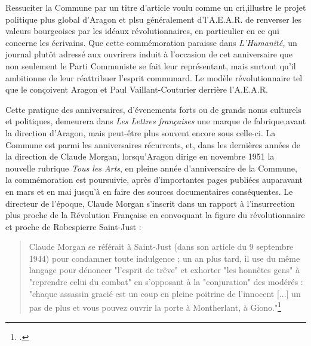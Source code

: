 Ressuciter la Commune par un titre d'article voulu comme un cri,illustre le projet politique plus global d'Aragon et plsu généralement d'l'A.E.A.R. de renverser les valeurs bourgeoises par les idéaux révolutionnaires, en particulier en ce qui concerne les écrivains. Que cette commémoration paraisse dans \emph{L'Humanité,} un journal plutôt adressé aux ouvrirers induit à l'occasion de cet anniversaire que non seulement le Parti Communiste se fait leur représentant, mais surtout qu'il ambitionne de leur réattribuer l'esprit communard. Le modèle révolutionnaire tel que le conçoivent Aragon et Paul Vaillant-Couturier derrière l'A.E.A.R. 

Cette pratique des anniversaires, d'évenements forts ou de grands noms culturels et politiques, demeurera dans \emph{Les Lettres françaises} une marque de fabrique,avant la direction d'Aragon, mais peut-être plus souvent encore sous celle-ci. La Commune est parmi les anniversaires récurrents, et, dans les dernières années de la direction de Claude Morgan, lorsqu'Aragon dirige en novembre 1951 la nouvelle rubrique \emph{Tous les Arts}, en pleine année d'anniversaire de la Commune, la commémoration est poursuivie, après d'importantes pages publiées auparavant en mars et en mai jusqu'à en faire des sources documentaires conséquentes. Le directeur de l'époque, Claude Morgan s'inscrit dans un rapport à l'insurrection plus proche de la Révolution Française en convoquant la figure du révolutionnaire et proche de Robespierre Saint-Just :

\begin{quote}
Claude Morgan se référait à Saint-Just (dans son article du 9 septembre 1944) pour condamner toute indulgence ; un an plus tard, il use du même langage pour dénoncer "l'esprit de trêve" et exhorter "les honnêtes gens" à "reprendre celui du combat" en s'opposant à la "conjuration" des modérés : "chaque assassin gracié est un coup en pleine poitrine de l'innocent [...] un pas de plus et vous pouvez ouvrir la porte à Montherlant, à Giono."\footcite[p538]{these}	
\end{quote}


